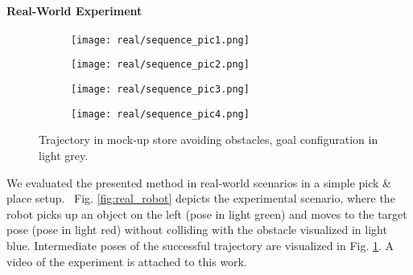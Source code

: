 \paragraph{Real-World Experiment}
\label{par:real_world}
%
\begin{figure}[ht]
  \centering
  \begin{subfigure}[b]{0.23\linewidth}
    \texttt{[image: real/sequence\_pic1.png]}
  \end{subfigure}
  \begin{subfigure}[b]{0.23\linewidth}
    \texttt{[image: real/sequence\_pic2.png]}
  \end{subfigure}
  \begin{subfigure}[b]{0.23\linewidth}
    \texttt{[image: real/sequence\_pic3.png]}
  \end{subfigure}
  \begin{subfigure}[b]{0.23\linewidth}
    \texttt{[image: real/sequence\_pic4.png]}
  \end{subfigure}
  \caption{Trajectory in mock-up store avoiding obstacles, goal configuration in light grey.}%
  \label{fig:real_case}
\end{figure}
%
We evaluated the presented method in real-world scenarios in a simple pick \& place setup. ~{Fig. \ref{fig:real_robot}} depicts the experimental scenario, where the robot picks up an object on the left (pose in light green) and moves to the target pose (pose in light red) without colliding with the obstacle visualized in light blue. Intermediate poses of the successful trajectory are visualized in Fig. \ref{fig:real_case}. A video of the experiment is attached to this work.
%
